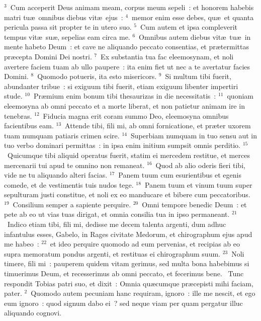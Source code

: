 ${}^{3}$~Cum acceperit Deus animam meam, corpus meum sepeli~: et honorem habebis matri tu\ae\ omnibus diebus vit\ae\ ejus~:
${}^{4}$~memor enim esse debes, qu\ae\ et quanta pericula passa sit propter te in utero suo.
${}^{5}$~Cum autem et ipsa compleverit tempus vit\ae\ su\ae , sepelias eam circa me.
${}^{6}$~Omnibus autem diebus vit\ae\ tu\ae\ in mente habeto Deum~: et cave ne aliquando peccato consentias, et pr\ae termittas pr\ae cepta Domini Dei nostri.
${}^{7}$~Ex substantia tua fac eleemosynam, et noli avertere faciem tuam ab ullo paupere~: ita enim fiet ut nec a te avertatur facies Domini.
${}^{8}$~Quomodo potueris, ita esto misericors.
${}^{9}$~Si multum tibi fuerit, abundanter tribue~: si exiguum tibi fuerit, etiam exiguum libenter impertiri stude.
${}^{10}$~Pr\ae mium enim bonum tibi thesaurizas in die necessitatis~:
${}^{11}$~quoniam eleemosyna ab omni peccato et a morte liberat, et non patietur animam ire in tenebras.
${}^{12}$~Fiducia magna erit coram summo Deo, eleemosyna omnibus facientibus eam.
${}^{13}$~Attende tibi, fili mi, ab omni fornicatione, et pr\ae ter uxorem tuam numquam patiaris crimen scire.
${}^{14}$~Superbiam numquam in tuo sensu aut in tuo verbo dominari permittas~: in ipsa enim initium sumpsit omnis perditio.
${}^{15}$~Quicumque tibi aliquid operatus fuerit, statim ei mercedem restitue, et merces mercenarii tui apud te omnino non remaneat.
${}^{16}$~Quod ab alio oderis fieri tibi, vide ne tu aliquando alteri facias.
${}^{17}$~Panem tuum cum esurientibus et egenis comede, et de vestimentis tuis nudos tege.
${}^{18}$~Panem tuum et vinum tuum super sepulturam justi constitue, et noli ex eo manducare et bibere cum peccatoribus.
${}^{19}$~Consilium semper a sapiente perquire.
${}^{20}$~Omni tempore benedic Deum~: et pete ab eo ut vias tuas dirigat, et omnia consilia tua in ipso permaneant.
${}^{21}$~Indico etiam tibi, fili mi, dedisse me decem talenta argenti, dum adhuc infantulus esses, Gabelo, in Rages civitate Medorum, et chirographum ejus apud me habeo~:
${}^{22}$~et ideo perquire quomodo ad eum pervenias, et recipias ab eo supra memoratum pondus argenti, et restituas ei chirographum suum.
${}^{23}$~Noli timere, fili mi~: pauperem quidem vitam gerimus, sed multa bona habebimus si timuerimus Deum, et recesserimus ab omni peccato, et fecerimus bene.
~\lettrine[lines=10,image=true,loversize=0.05,lraise=-0.03]{T}{}unc respondit Tobias patri suo, et dixit~: Omnia qu\ae cumque pr\ae cepisti mihi faciam, pater.
${}^{2}$~Quomodo autem pecuniam hanc requiram, ignoro~: ille me nescit, et ego eum ignoro~: quod signum dabo ei~? sed neque viam per quam pergatur illuc aliquando cognovi.
